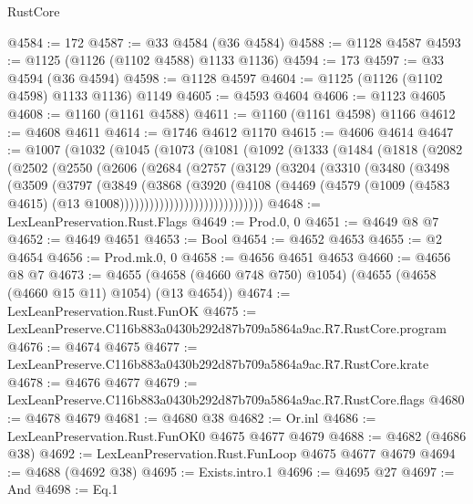 \begin{lexlean}{RustCore}
\begin{coremodule}
@4584 := 172
@4587 := @33 @4584 (@36 @4584)
@4588 := @1128 @4587
@4593 := @1125 (@1126 (@1102 @4588) @1133 @1136)
@4594 := 173
@4597 := @33 @4594 (@36 @4594)
@4598 := @1128 @4597
@4604 := @1125 (@1126 (@1102 @4598) @1133 @1136) @1149
@4605 := @4593 @4604
@4606 := @1123 @4605
@4608 := @1160 (@1161 @4588)
@4611 := @1160 (@1161 @4598) @1166
@4612 := @4608 @4611
@4614 := @1746 @4612 @1170
@4615 := @4606 @4614
@4647 := @1007
    (@1032
      (@1045
        (@1073
          (@1081
            (@1092
              (@1333
                (@1484
                  (@1818
                    (@2082
                      (@2502
                        (@2550
                          (@2606
                            (@2684
                              (@2757
                                (@3129
                                  (@3204
                                    (@3310
                                      (@3480
                                        (@3498
                                          (@3509
                                            (@3797
                                              (@3849
                                                (@3868
                                                  (@3920
                                                    (@4108
                                                      (@4469
                                                        (@4579
                                                          (@1009
                                                            (@4583 @4615)
                                                            (@13 @1008)))))))))))))))))))))))))))))
@4648 := LexLeanPreservation.Rust.Flags
@4649 := Prod.{0, 0}
@4651 := @4649 @8 @7
@4652 := @4649 @4651
@4653 := Bool
@4654 := @4652 @4653
@4655 := @2 @4654
@4656 := Prod.mk.{0, 0}
@4658 := @4656 @4651 @4653
@4660 := @4656 @8 @7
@4673 := @4655 (@4658 (@4660 @748 @750) @1054) (@4655 (@4658 (@4660 @15 @11) @1054) (@13 @4654))
@4674 := LexLeanPreservation.Rust.FunOK
@4675 := LexLeanPreserve.C116b883a0430b292d87b709a5864a9ac.R7.RustCore.program
@4676 := @4674 @4675
@4677 := LexLeanPreserve.C116b883a0430b292d87b709a5864a9ac.R7.RustCore.krate
@4678 := @4676 @4677
@4679 := LexLeanPreserve.C116b883a0430b292d87b709a5864a9ac.R7.RustCore.flags
@4680 := @4678 @4679
@4681 := @4680 @38
@4682 := Or.inl
@4686 := LexLeanPreservation.Rust.FunOK0 @4675 @4677 @4679
@4688 := @4682 (@4686 @38)
@4692 := LexLeanPreservation.Rust.FunLoop @4675 @4677 @4679
@4694 := @4688 (@4692 @38)
@4695 := Exists.intro.{1}
@4696 := @4695 @27
@4697 := And
@4698 := Eq.{1}

\end{coremodule}
\end{lexlean}
